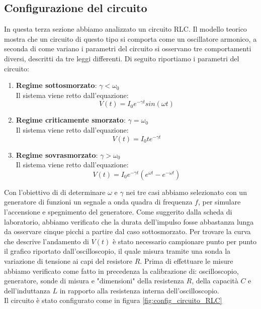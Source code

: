 \documentclass[letterpaper,12pt]{article}
\begin{document}
\subsection{Configurazione del circuito}
In questa terza sezione abbiamo analizzato un circuito RLC. Il modello teorico mostra che un circuito di questo tipo si comporta come un oscillatore armonico, a seconda di come variano i parametri del circuito si osservano tre comportamenti diversi, descritti da tre leggi differenti. Di seguito riportiamo i parametri del circuito:
\begin{enumerate}
	\item \textbf{Regime sottosmorzato}: $\gamma < \omega_0$\\
	      Il sistema viene retto dall'equazione:
	      \begin{equation}
		      \label{eq: Modello sottosmorzato}
		      V(t) = I_0e^{-\gamma t} sin(\omega t)
	      \end{equation}

	\item \textbf{Regime criticamente smorzato}: $\gamma = \omega_0$\\
	      Il sistema viene retto dall'equazione:
	      \begin{equation}
              \label{eq: Modello criticamente smorzato}
		      V(t) = I_0 t e^{-\gamma t}
	      \end{equation}

	\item \textbf{Regime sovrasmorzato}: $\gamma > \omega_0$\\
	      Il sistema viene retto dall'equazione:
	      \begin{equation}
              \label{eq: Modello sovrasmorzato}
		      V(t) = I_0 e^{-\gamma t} (e^{\omega t} - e^{-\omega t})
	      \end{equation}
\end{enumerate}
Con l'obiettivo di di determinare $\omega$ e $\gamma$ nei tre casi abbiamo selezionato con un generatore di funzioni un segnale a onda quadra di frequenza $f$, per simulare l'accensione e spegnimento del generatore. Come suggerito dalla scheda di laboratorio, abbiamo verificato che la durata dell'impulso fosse abbastanza lunga da osservare cinque picchi a partire dal caso sottosmorzato.
Per trovare la curva che descrive l'andamento di $V(t)$ è stato necessario campionare punto per punto il grafico riportato dall'oscilloscopio, il quale misura tramite una sonda la variazione di tensione ai capi del resistore $R$. Prima di effettuare le misure abbiamo verificato come fatto in precedenza la calibrazione di: oscilloscopio, generatore, sonde di misura e "dimensioni" della resistenza $R$, della capacità $C$ e dell'induttanza $L$ in rapporto alla resistenza interna dell'oscilloscopio.\\
Il circuito è stato configurato come in figura \ref{fig:config_circuito_RLC}\\
\end{document}
